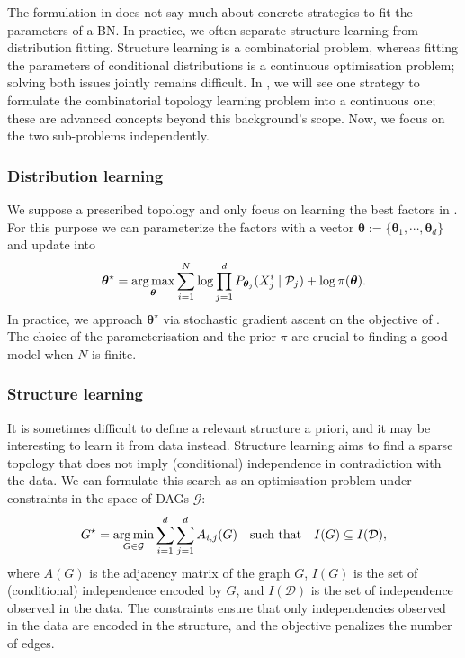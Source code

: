 The formulation in  does not say much about concrete strategies to fit the parameters of a BN. In practice, we often separate structure learning from distribution fitting. Structure learning is a combinatorial problem, whereas fitting the parameters of conditional distributions is a continuous optimisation problem; solving both issues jointly remains difficult. In , we will see one strategy to formulate the combinatorial topology learning problem into a continuous one; these are advanced concepts beyond this background's scope. Now, we focus on the two sub-problems independently.

\subsubsection{Distribution learning}
We suppose a prescribed topology and only focus on learning the best factors in . For this purpose we can parameterize the factors with a vector $\bm \theta := \{\bm{\theta}_1, \cdots, \bm{\theta}_d\}$ and update  into
\begin{align}
  {\bm \theta}^\star  = \operatorname*{arg\,max}_{\bm \theta} \sum_{i=1}^N \log \prod^d_{j=1}P_{\bm{\theta}_j}(X_j^i\mid \mathcal{P}_j) + \log \pi(\bm \theta).
 \label{eq:learn_factors}
\end{align}
In practice, we approach ${\bm \theta}^\star$ via stochastic gradient ascent on the objective of .
The choice of the parameterisation and the prior $\pi$ are crucial to finding a good model when $N$ is finite.

\subsubsection{Structure learning}
It is sometimes difficult to define a relevant structure a priori, and it may be interesting to learn it from data instead. Structure learning aims to find a sparse topology that does not imply (conditional) independence in contradiction with the data. We can formulate this search as an optimisation problem under constraints in the space of DAGs $\mathcal{G}$:
\begin{align}
 G^\star = \operatorname*{arg\,min}_{G \in \mathcal{G}} \sum_{i=1}^d\sum_{j=1}^d A_{i,j}(G) \quad \text{such that} \quad I(G) \subseteq I(\mathcal{D}), \label{eq:learn_structure}
\end{align}
where $A(G)$ is the adjacency matrix of the graph $G$, $I(G)$ is the set of (conditional) independence encoded by $G$, and $I(\mathcal{D})$ is the set of independence observed in the data. The constraints ensure that only independencies observed in the data are encoded in the structure, and the objective penalizes the number of edges.

